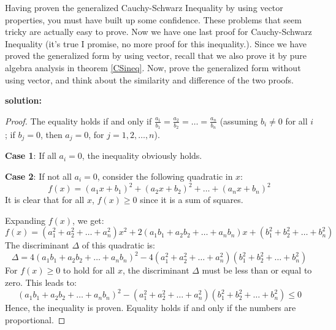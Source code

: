 \documentclass[
	12pt, %
	fleqn, %
	a4paper, %
]{LegrandOrangeBook}
\begin{document}
\begin{exercise}
    Having proven the generalized Cauchy-Schwarz Inequality by using vector properties, you must have
    built up some confidence. These problems that seem tricky are actually easy to prove. Now we have 
    one last proof for  Cauchy-Schwarz Inequality (it's true I promise, no more proof for this inequality.).
    Since we have proved the generalized form by using vector, recall that we also prove it by pure algebra
    analysis in theorem \ref{CSineq}. Now, prove the generalized form without using vector, and think
    about the similarity and difference of the two proofs.
\end{exercise}
\textbf{solution:}
\begin{proof}
    The equality holds if and only if \( \frac{a_1}{b_1} = \frac{a_2}{b_2} = \ldots = \frac{a_n}{b_n} \) (assuming \( b_i \neq 0 \) for all \( i \); if \( b_j = 0 \), then \( a_j = 0 \), for \( j = 1, 2, \ldots, n \)).
    
    \textbf{Case 1}: If all \( a_i = 0 \), the inequality obviously holds.
    
    \textbf{Case 2}: If not all \( a_i = 0 \), consider the following quadratic in \( x \):
    \[
    f(x) = (a_1x + b_1)^2 + (a_2x + b_2)^2 + \ldots + (a_nx + b_n)^2
    \]
    It is clear that for all \( x \), \( f(x) \geq 0 \) since it is a sum of squares.
    
    Expanding \( f(x) \), we get:
    \[
    f(x) = (a_1^2 + a_2^2 + \ldots + a_n^2)x^2 + 2(a_1b_1 + a_2b_2 + \ldots + a_nb_n)x + (b_1^2 + b_2^2 + \ldots + b_n^2)
    \]
    The discriminant \( \Delta \) of this quadratic is:
    \[
    \Delta = 4(a_1b_1 + a_2b_2 + \ldots + a_nb_n)^2 - 4(a_1^2 + a_2^2 + \ldots + a_n^2)(b_1^2 + b_2^2 + \ldots + b_n^2)
    \]
    For \( f(x) \geq 0 \) to hold for all \( x \), the discriminant \( \Delta \) must be less than or equal to zero. This leads to:
    \[
    (a_1b_1 + a_2b_2 + \ldots + a_nb_n)^2 - (a_1^2 + a_2^2 + \ldots + a_n^2)(b_1^2 + b_2^2 + \ldots + b_n^2) \leq 0
    \]
    Hence, the inequality is proven. Equality holds if and only if the numbers are proportional.
    \end{proof}
\end{document}
